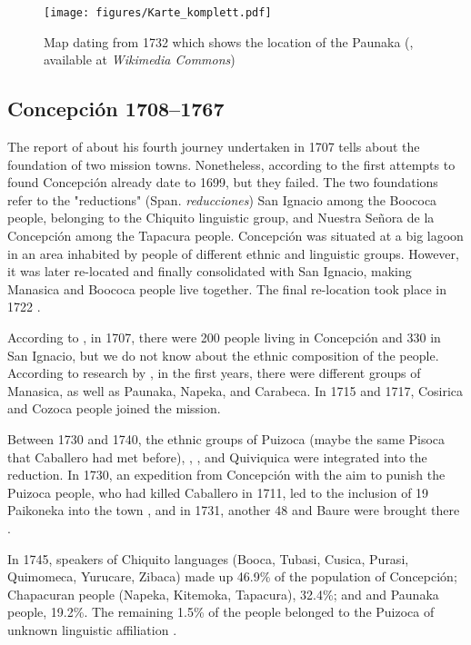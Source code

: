 \begin{figure}
\centering
\texttt{[image: figures/Karte\_komplett.pdf]}
\caption[Map dating from 1732, which shows the location of the Paunaka]{Map dating from 1732 which shows the location of the Paunaka (\cite[]{Petroschi1732}, available at \textit{Wikimedia Commons})}
\label{fig:Map1732}
\end{figure}


\subsection{Concepción 1708–1767}\label{sec:Conce1708-1767}

The report of \citet[52]{Matienzo_et_al2011} about his fourth journey undertaken in 1707 tells about the foundation of two mission towns. Nonetheless, according to \citet[538]{TomichaCharupa2002} the first attempts to found Concepción already date to 1699, but they failed.
The two foundations refer to the "reductions" (Span. \textit{reducciones}) San Ignacio among the Boococa people, belonging to the Chiquito linguistic group, and Nuestra Señora de la Concepción among the Tapacura people. Concepción was situated at a big lagoon in an area inhabited by people of different ethnic and linguistic groups. However, it was later re-located and finally consolidated with San Ignacio, making Manasica and Boococa people live together. The final re-location took place in 1722 \citep[538--539]{TomichaCharupa2002}.

According to \citet[90]{MatienzoAL2011}, in 1707, there were 200 people living in Concepción and 330 in San Ignacio, but we do not know about the ethnic composition of the people.
According to research by \citet[284]{TomichaCharupa2002}, in the first years, there were different groups of Manasica, as well as Paunaka, Napeka, and Carabeca. %
In 1715 and 1717, Cosirica and Cozoca people joined the mission.

Between 1730 and 1740, the ethnic groups of Puizoca (maybe the same Pisoca that Caballero had met before), , , and Quiviquica were integrated into the reduction. In 1730, an expedition from Concepción with the aim to punish the Puizoca people, who had killed Caballero in 1711, led to the inclusion of 19 Paikoneka into the town \citep[166, 192-193]{MatienzoAL2011}, and in 1731, another 48  and Baure were brought there \citep[206]{MatienzoAL2011}.

In 1745, speakers of Chiquito languages (Booca, Tubasi, Cusica, Purasi, Quimomeca, Yurucare, Zibaca) made up 46.9\% of the population of Concepción; Chapacuran people (Napeka, Kitemoka, Tapacura), 32.4\%; and  and Paunaka people, 19.2\%. The remaining 1.5\% of the people belonged to the Puizoca of unknown linguistic affiliation \citep[288]{TomichaCharupa2002}.


